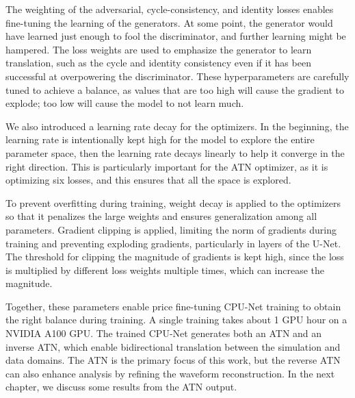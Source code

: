 The weighting of the adversarial, cycle-consistency, and identity losses enables fine-tuning the learning of the generators. At some point, the generator would have learned just enough to fool the discriminator, and further learning might be hampered. The loss weights are used to emphasize the generator to learn translation, such as the cycle and identity consistency even if it has been successful at overpowering the discriminator. These hyperparameters are carefully tuned to achieve a balance, as values that are too high will cause the gradient to explode; too low will cause the model to not learn much. 

We also introduced a learning rate decay for the optimizers. In the beginning, the learning rate is intentionally kept high for the model to explore the entire parameter space, then the learning rate decays linearly to help it converge in the right direction. This is particularly important for the ATN optimizer, as it is optimizing six losses, and this ensures that all the space is explored.

To prevent overfitting during training, weight decay is applied to the optimizers so that it penalizes the large weights and ensures generalization among all parameters. Gradient clipping is applied, limiting the norm of gradients during training and preventing exploding gradients, particularly in layers of the U-Net. The threshold for clipping the magnitude of gradients is kept high, since the loss is multiplied by different loss weights multiple times, which can increase the magnitude.

Together, these parameters enable price fine-tuning CPU-Net training to obtain the right balance during training. A single training takes about 1 GPU hour on a NVIDIA A100 GPU. The trained CPU-Net generates both an ATN and an inverse ATN, which enable bidirectional translation between the simulation and data domains. The ATN is the primary focus of this work, but the reverse ATN can also enhance analysis by refining the waveform reconstruction. In the next chapter, we discuss some results from the ATN output.